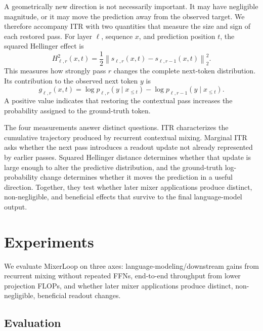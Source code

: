 \documentclass{article}
\begin{document}
A geometrically new direction is not necessarily important. It may have
negligible magnitude, or it may move the prediction away from the observed
target. We therefore accompany ITR with two quantities that measure the size
and sign of each restored pass. For layer $\ell$, sequence $x$, and prediction
position $t$, the squared Hellinger effect is
\begin{equation}
H_{\ell,r}^2(x,t)
=\frac{1}{2}
\left\|s_{\ell,r}(x,t)-s_{\ell,r-1}(x,t)\right\|_2^2.
\label{eq:hellinger}
\end{equation}
This measures how strongly pass $r$ changes the complete next-token
distribution. Its contribution to the observed next token $y$ is
\begin{equation}
g_{\ell,r}(x,t)
=\log p_{\ell,r}(y\mid x_{\leq t})-
\log p_{\ell,r-1}(y\mid x_{\leq t}).
\label{eq:true_token_gain}
\end{equation}
A positive value indicates that restoring the contextual pass increases the
probability assigned to the ground-truth token.

The four measurements answer distinct questions. ITR characterizes the
cumulative trajectory produced by recurrent contextual mixing. Marginal ITR
asks whether the next pass introduces a readout update not already represented
by earlier passes. Squared Hellinger distance determines whether that update is
large enough to alter the predictive distribution, and the ground-truth
log-probability change determines whether it moves the prediction in a useful
direction. Together, they test whether later mixer applications produce
distinct, non-negligible, and beneficial effects that survive to the final
language-model output.




\section{Experiments}
\label{sec:experiments}

We evaluate MixerLoop on three axes: language-modeling/downstream gains from
recurrent mixing without repeated FFNs, end-to-end throughput from lower
projection FLOPs, and whether later mixer applications produce distinct,
non-negligible, beneficial readout changes.

\subsection{Evaluation}
\end{document}
